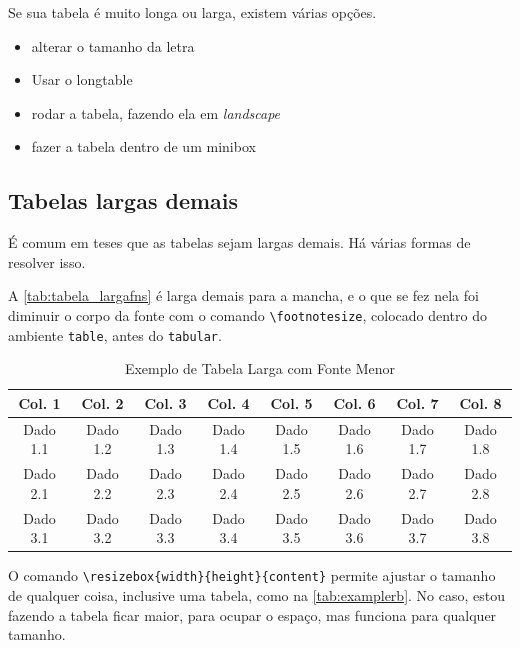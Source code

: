 \documentclass[dsc,pdfa,setavermelha]{ufrj}
\theoremstyle{plain}
\theoremstyle{definition}
\theoremstyle{remark}
\begin{document}
Se sua tabela é muito longa ou larga, existem várias opções.
\begin{itemize}
    \item alterar o tamanho da letra
    \item Usar o longtable
    \item rodar a tabela, fazendo ela em \textit{landscape}
    \item fazer a tabela dentro de um minibox
\end{itemize}

\subsection{Tabelas largas demais}

É comum em teses que as tabelas sejam largas demais. Há várias formas de resolver isso.

A \autoref{tab:tabela_largafns} é larga demais para a mancha, e o que se fez nela foi diminuir o corpo da fonte com o comando \verb|\footnotesize|, colocado dentro do ambiente \verb|table|, antes do \verb|tabular|.

\begin{table}[ht]
\centering %
\caption{Exemplo de Tabela Larga com Fonte Menor}
\label{tab:tabela_largafns}
\footnotesize %
\begin{tabular}{cccccccc} %
\toprule
\textbf{Col. 1} & \textbf{Col. 2} & \textbf{Col. 3} & \textbf{Col. 4} & \textbf{Col. 5} & \textbf{Col. 6} & \textbf{Col. 7} & \textbf{Col. 8} \\
\midrule
Dado 1.1 & Dado 1.2 & Dado 1.3 & Dado 1.4 & Dado 1.5 & Dado 1.6 & Dado 1.7 & Dado 1.8 \\
Dado 2.1 & Dado 2.2 & Dado 2.3 & Dado 2.4 & Dado 2.5 & Dado 2.6 & Dado 2.7 & Dado 2.8 \\
Dado 3.1 & Dado 3.2 & Dado 3.3 & Dado 3.4 & Dado 3.5 & Dado 3.6 & Dado 3.7 & Dado 3.8 \\
\bottomrule
\end{tabular}
\end{table}

O comando \verb|\resizebox{width}{height}{content}| permite ajustar o tamanho de qualquer coisa, inclusive uma tabela, como na \autoref{tab:examplerb}. No caso, estou fazendo a tabela ficar maior, para ocupar o espaço, mas funciona para qualquer tamanho.

\begin{table}[ht]
\centering
\caption{Exemplo de Tabela Redimensionada}
\label{tab:examplerb}
\end{table}
\end{document}
